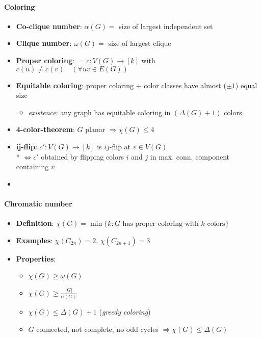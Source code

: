 \paragraph{Coloring}
\begin{itemize}
  \item \textbf{Co-clique number}: $ \alpha(G) = $ size of largest independent set
  \item \textbf{Clique number}: $ \omega(G) = $ size of largest clique
  \item \textbf{Proper coloring}: $ = c : V(G) \to [k] $ with $ c(u) \neq c(v) \quad (\forall uv \in E(G)) $
  \item \textbf{Equitable coloring}: proper coloring + color classes have almost ($ \pm 1 $) equal size
  \begin{itemize}
    \item \emph{existence}: any graph has equitable coloring in $ (\Delta(G) + 1) $ colors 
  \end{itemize}
  \item \textbf{4-color-theorem}: $ G $ planar $ \Rightarrow \chi(G) \leq 4 $ 
  \item \textbf{ij-flip}: $ c': V(G) \to [k] $ is $ ij $-flip at $ v \in V(G) $ \\*
    $ \Leftrightarrow c' $ obtained by flipping colors $ i $ and $ j $ in max. conn. component containing $ v $
  \item 
\end{itemize}

\paragraph{Chromatic number}
\begin{itemize}
  \item \textbf{Definition}: $ \chi(G) = \min\{ k: G \text{ has proper coloring with } k \text{ colors} \} $ 
  \item \textbf{Examples}: $ \chi(C_{2n}) = 2 $, $ \chi(C_{2n+1}) = 3 $
  \item \textbf{Properties}:
  \begin{itemize}
    \item $ \chi(G) \geq \omega(G) $ 
    \item $ \chi(G) \geq \frac{\vert G \vert}{\alpha(G)} $
    \item $ \chi(G) \leq \Delta(G) + 1 $ (\emph{greedy coloring})
    \item $ G $ connected, not complete, no odd cycles $ \Rightarrow \chi(G) \leq \Delta(G) $
  \end{itemize}
\end{itemize}

